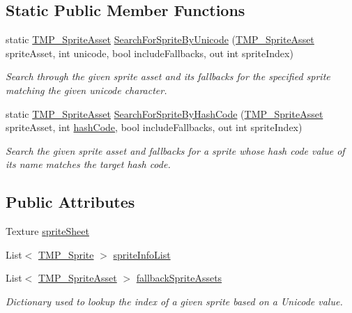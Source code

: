 \subsection*{Static Public Member Functions}
\begin{DoxyCompactItemize}
\item 
static \mbox{\hyperlink{class_t_m_pro_1_1_t_m_p___sprite_asset}{T\+M\+P\+\_\+\+Sprite\+Asset}} \mbox{\hyperlink{class_t_m_pro_1_1_t_m_p___sprite_asset_afb7045fdaad0e5ee7585d9ccac6b279c}{Search\+For\+Sprite\+By\+Unicode}} (\mbox{\hyperlink{class_t_m_pro_1_1_t_m_p___sprite_asset}{T\+M\+P\+\_\+\+Sprite\+Asset}} sprite\+Asset, int unicode, bool include\+Fallbacks, out int sprite\+Index)
\begin{DoxyCompactList}\small\item\em Search through the given sprite asset and its fallbacks for the specified sprite matching the given unicode character. \end{DoxyCompactList}\item 
static \mbox{\hyperlink{class_t_m_pro_1_1_t_m_p___sprite_asset}{T\+M\+P\+\_\+\+Sprite\+Asset}} \mbox{\hyperlink{class_t_m_pro_1_1_t_m_p___sprite_asset_a0a140b6024a1c437a950681c7c9f4212}{Search\+For\+Sprite\+By\+Hash\+Code}} (\mbox{\hyperlink{class_t_m_pro_1_1_t_m_p___sprite_asset}{T\+M\+P\+\_\+\+Sprite\+Asset}} sprite\+Asset, int \mbox{\hyperlink{class_t_m_pro_1_1_t_m_p___asset_a63f177ff7028859d2b431789737d8ccc}{hash\+Code}}, bool include\+Fallbacks, out int sprite\+Index)
\begin{DoxyCompactList}\small\item\em Search the given sprite asset and fallbacks for a sprite whose hash code value of its name matches the target hash code. \end{DoxyCompactList}\end{DoxyCompactItemize}
\subsection*{Public Attributes}
\begin{DoxyCompactItemize}
\item 
Texture \mbox{\hyperlink{class_t_m_pro_1_1_t_m_p___sprite_asset_ad58008ac004e19c361192d6159f34367}{sprite\+Sheet}}
\item 
List$<$ \mbox{\hyperlink{class_t_m_pro_1_1_t_m_p___sprite}{T\+M\+P\+\_\+\+Sprite}} $>$ \mbox{\hyperlink{class_t_m_pro_1_1_t_m_p___sprite_asset_a6770844be35fbf6d455eadbc9a528372}{sprite\+Info\+List}}
\item 
List$<$ \mbox{\hyperlink{class_t_m_pro_1_1_t_m_p___sprite_asset}{T\+M\+P\+\_\+\+Sprite\+Asset}} $>$ \mbox{\hyperlink{class_t_m_pro_1_1_t_m_p___sprite_asset_a417cdcac52c66835dcdb3ef8fdf15b3c}{fallback\+Sprite\+Assets}}
\begin{DoxyCompactList}\small\item\em Dictionary used to lookup the index of a given sprite based on a Unicode value. \end{DoxyCompactList}\end{DoxyCompactItemize}
